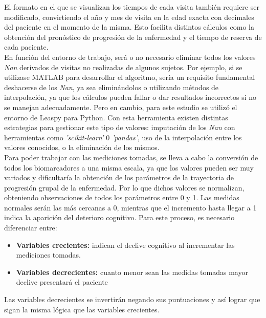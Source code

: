 El formato en el que se visualizan los tiempos de cada visita también requiere ser modificado, convirtiendo el año y mes de visita en la edad exacta con decimales del paciente en el momento de la misma. Esto facilita distintos cálculos como la obtención del pronóstico de progresión de la enfermedad y el tiempo de reserva de cada paciente.\\

En función del entorno de trabajo, será o no necesario eliminar todos los valores \textit{Nan} derivados de visitas no realizadas de algunos sujetos. Por ejemplo, si se utilizase MATLAB para desarrollar el algoritmo, sería un requisito fundamental deshacerse de los \textit{Nan}, ya sea eliminándolos o utilizando métodos de interpolación, ya que los cálculos pueden fallar o dar resultados incorrectos si no se manejan adecuadamente. Pero en cambio, para este estudio se utilizó el entorno de Leaspy para Python. Con esta herramienta existen distintas estrategias para gestionar este tipo de valores: imputación de los \textit{Nan} con herramientas como \textit{'scikit-learn'} 0 \textit{'pandas'}, uso de la interpolación entre los valores conocidos, o la eliminación de los mismos.\\

Para poder trabajar con las mediciones tomadas, se lleva a cabo la conversión de todos los biomarcadores a una misma escala, ya que los valores pueden ser muy variados y dificultaría la obtención de los parámetros de la trayectoria de progresión grupal de la enfermedad. Por lo que dichos valores se normalizan, obteniendo observaciones de todos los parámetros entre 0 y 1. Las medidas normales serán las más cercanas a 0, mientras que el incremento hasta llegar a 1 indica la aparición del deterioro cognitivo. Para este proceso, es necesario diferenciar entre:
\begin{itemize}
	\item \textbf{Variables crecientes:} indican el declive cognitivo al incrementar las mediciones tomadas.
	\item \textbf{Variables decrecientes:} cuanto menor sean las medidas tomadas mayor declive presentará el paciente
\end{itemize}

Las variables decrecientes se invertirán negando sus puntuaciones y así lograr que sigan la misma lógica que las variables crecientes.\\

